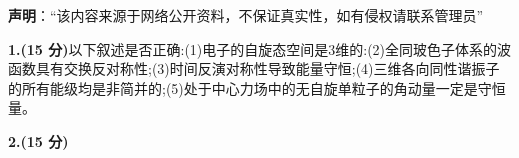 
\textbf{声明}：“该内容来源于网络公开资料，不保证真实性，如有侵权请联系管理员”

\textbf{1.(15 分)}以下叙述是否正确:(1)电子的自旋态空间是3维的:(2)全同玻色子体系的波函数具有交换反对称性;(3)时间反演对称性导致能量守恒;(4)三维各向同性谐振子的所有能级均是非简并的;(5)处于中心力场中的无自旋单粒子的角动量一定是守恒量。

\textbf{2.(15 分)}